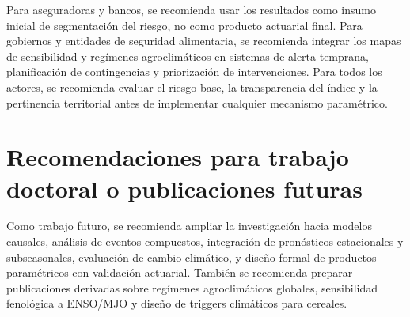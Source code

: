 Para aseguradoras y bancos, se recomienda usar los resultados como insumo inicial de segmentación del riesgo, no como producto actuarial final. Para gobiernos y entidades de seguridad alimentaria, se recomienda integrar los mapas de sensibilidad y regímenes agroclimáticos en sistemas de alerta temprana, planificación de contingencias y priorización de intervenciones. Para todos los actores, se recomienda evaluar el riesgo base, la transparencia del índice y la pertinencia territorial antes de implementar cualquier mecanismo paramétrico.

\section{Recomendaciones para trabajo doctoral o publicaciones futuras}

Como trabajo futuro, se recomienda ampliar la investigación hacia modelos causales, análisis de eventos compuestos, integración de pronósticos estacionales y subseasonales, evaluación de cambio climático, y diseño formal de productos paramétricos con validación actuarial. También se recomienda preparar publicaciones derivadas sobre regímenes agroclimáticos globales, sensibilidad fenológica a ENSO/MJO y diseño de triggers climáticos para cereales.
